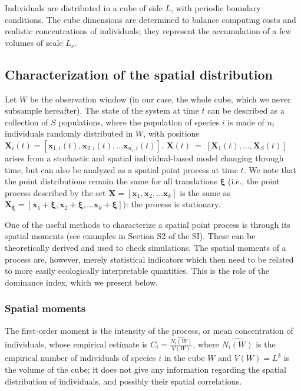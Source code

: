 \documentclass[english]{article}
\newcommand{\bx}{\boldsymbol{x}}
\newcommand{\bxi}{\boldsymbol{\xi} }
\begin{document}
Individuals are distributed in a cube of side $L$, with periodic
boundary conditions.  The cube dimensions are determined to balance
computing costs and realistic concentrations of individuals; they
represent the accumulation of a few volumes of scale $L_{s}$.

\subsection*{Characterization of the spatial distribution}

Let $W$ be the observation window (in our case, the whole cube, which
we never subsample hereafter). The state of the system at time $t$
can be described as a collection of $S$ populations, where the population
of species $i$ is made of $n_{i}$ individuals randomly distributed
in $W$, with positions $\boldsymbol{X}_{i}(t)=[\bx_{1,i}(t),\bx_{2,i}(t),...\bx_{n_{i},i}(t)]$.
$\boldsymbol{X}(t)~=~[\boldsymbol{X}_{1}(t),\ldots,\boldsymbol{X}_{S}(t)]$
arises from a stochastic and spatial individual-based model changing
through time, but can also be analyzed as a spatial point process
at time $t$. We note that the point distributions remain the same
for all translations $\bxi$ (i.e., the point process
described by the set $\boldsymbol{X}=[\bx_{1},\bx_{2},...\bx_{k}]$
is the same as $\boldsymbol{X_{\xi}}=[\bx_{1}+\bxi,\bx_{2}+\bxi,...\bx_{k}+\bxi])$:
the process is stationary.

One of the useful methods to characterize a spatial point process
is through its spatial moments (see examples in Section S2 of the
SI). These can be theoretically derived and used to check simulations.
The spatial moments of a process are, however, merely statistical
indicators which then need to be related to more easily ecologically
interpretable quantities. This is the role of the dominance index,
which we present below.

\subsubsection*{Spatial moments}

The first-order moment is the intensity of the process, or mean concentration
of individuals, whose empirical estimate is $C_{i}=\frac{\widehat{N_{i}(W)}}{V(W)}$,
where $\widehat{N_{i}(W)}$ is the empirical number of individuals of species $i$ in
the cube $W$ and $V(W)=L^{3}$ is the volume of the cube; it does
not give any information regarding the spatial distribution of individuals,
and possibly their spatial correlations.
\end{document}
